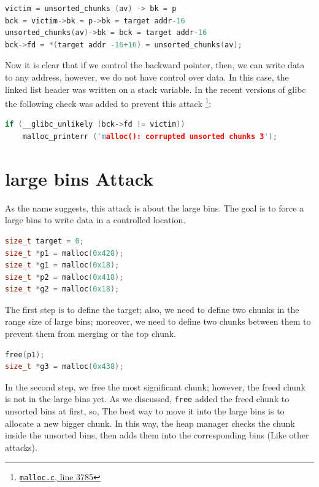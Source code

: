 \documentclass{masterthesis}
\newcommand*\libc{glibc}
\newcommand*\ub{unsorted bins}
\newcommand*\lb{large bins}
\newcommand*\freec{\lstinline{free}\xspace}
\begin{document}
\begin{lstlisting}[language=c,frame=tlrb]
victim = unsorted_chunks (av) -> bk = p
bck = victim->bk = p->bk = target addr-16
unsorted_chunks(av)->bk = bck = target addr-16
bck->fd = *(target addr -16+16) = unsorted_chunks(av);
\end{lstlisting}

Now it is clear that if we control the backward pointer, then, we can write data to any address, however, we do not have control over data. In this case, the linked list header was written on a stack variable. In the recent versions of \libc{} the following check was added to prevent this attack \footnote{\href{https://sourceware.org/git/?p=glibc.git;a=blob;f=malloc/malloc.c;h=f7cd29bc2f93e1082ee77800bd64a4b2a2897055;hb=9ea3686266dca3f004ba874745a4087a89682617\#l3785}{\texttt{malloc.c}, line 3785}}:

\begin{lstlisting}[language=c,frame=tlrb]
if (__glibc_unlikely (bck->fd != victim))
	malloc_printerr ('malloc(): corrupted unsorted chunks 3');
\end{lstlisting}

\section{\lb{} Attack}

As the name suggests, this attack is about the \lb{}. The goal is to force a \lb{} to write data in a controlled location.

\begin{lstlisting}[language=c,frame=tlrb]
size_t target = 0;
size_t *p1 = malloc(0x428);
size_t *g1 = malloc(0x18);
size_t *p2 = malloc(0x418);
size_t *g2 = malloc(0x18);
\end{lstlisting}

The first step is to define the target; also, we need to define two chunks in the range size of \lb{}; moreover, we need to define two chunks between them to prevent them from merging or the top chunk.

\begin{lstlisting}[language=c,frame=tlrb]
free(p1);
size_t *g3 = malloc(0x438);
\end{lstlisting}

In the second step, we free the most significant chunk; however, the freed chunk is not in the \lb{} yet. As we discussed, \freec{} added the freed chunk to \ub{} at first, so, The best way to move it into the \lb{} is to allocate a new bigger chunk. In this way, the heap manager checks the chunk inside the \ub{}, then adds them into the corresponding bins (Like other attacks).
\end{document}
